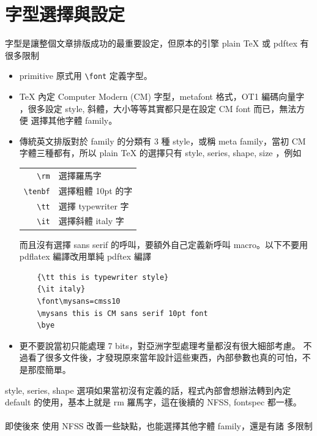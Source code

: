 \section{字型選擇與設定}
字型是讓整個文章排版成功的最重要設定，但原本的引擎 plain \TeX{} 或 pdftex
有很多限制
\begin{itemize}
  \item primitive 原式用 \verb=\font= 定義字型。
  \item \TeX{} 內定 Computer Modern (CM) 字型，metafont 格式，OT1 編碼向量字
    ，很多設定 style, 斜體，大小等等其實都只是在設定 CM font 而已，無法方便
    選擇其他字體 family。
  \item 傳統英文排版對於 family 的分類有 3 種 style，或稱 meta family，當初
    CM 字體三種都有，所以 plain \TeX{} 的選擇只有 style, series, shape, size
    ，例如
    \begin{center}
    \begin{tabular}{rl}
      \verb=\rm= & 選擇羅馬字 \\
      \verb=\tenbf= & 選擇粗體 10pt 的字 \\
      \verb=\tt= & 選擇 typewriter 字 \\
      \verb=\it= & 選擇斜體 italy 字 \\
    \end{tabular}
    \end{center}
    而且沒有選擇 sans serif 的呼叫，要額外自己定義新呼叫 macro。以下不要用
    pdflatex 編譯改用單純 pdftex 編譯
    \begin{verbatim}
    {\tt this is typewriter style}
    {\it italy}
    \font\mysans=cmss10
    \mysans this is CM sans serif 10pt font
    \bye
    \end{verbatim}
  \item 更不要說當初只能處理 7 bits，對亞洲字型處理考量都沒有很大細部考慮。
    不過看了很多文件後，才發現原來當年設計這些東西，內部參數也真的可怕，不
    是那麼簡單。
\end{itemize}

style, series, shape 選項如果當初沒有定義的話，程式內部會想辦法轉到內定
default 的使用，基本上就是 rm 羅馬字，這在後續的 NFSS, fontspec 都一樣。
\\\\
即使後來 \LaTeXe{} 使用 NFSS 改善一些缺點，也能選擇其他字體 family，還是有諸
多限制

